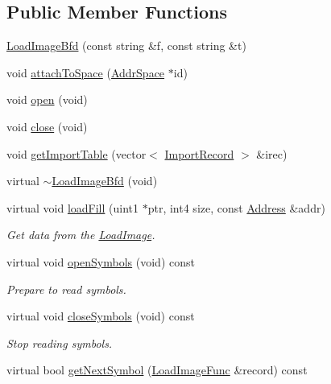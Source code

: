 \subsection*{Public Member Functions}
\begin{DoxyCompactItemize}
\item 
\mbox{\hyperlink{class_load_image_bfd_a3dbf8efbc462647404d8263f2e42b18c}{Load\+Image\+Bfd}} (const string \&f, const string \&t)
\item 
void \mbox{\hyperlink{class_load_image_bfd_ae7779df9e518dba07746692c5391cd82}{attach\+To\+Space}} (\mbox{\hyperlink{class_addr_space}{Addr\+Space}} $\ast$id)
\item 
void \mbox{\hyperlink{class_load_image_bfd_a87816fd410acb9003a010e8cb4b2b5f4}{open}} (void)
\item 
void \mbox{\hyperlink{class_load_image_bfd_af0297020340300588572090ae50ff145}{close}} (void)
\item 
void \mbox{\hyperlink{class_load_image_bfd_aed37920fc29c5251f29061bf4479e6fc}{get\+Import\+Table}} (vector$<$ \mbox{\hyperlink{struct_import_record}{Import\+Record}} $>$ \&irec)
\item 
virtual \mbox{\hyperlink{class_load_image_bfd_a449f33ca39e93b36288d2b45c18831d8}{$\sim$\+Load\+Image\+Bfd}} (void)
\item 
virtual void \mbox{\hyperlink{class_load_image_bfd_a78225283223f58c852c4b63af4fc8791}{load\+Fill}} (uint1 $\ast$ptr, int4 size, const \mbox{\hyperlink{class_address}{Address}} \&addr)
\begin{DoxyCompactList}\small\item\em Get data from the \mbox{\hyperlink{class_load_image}{Load\+Image}}. \end{DoxyCompactList}\item 
virtual void \mbox{\hyperlink{class_load_image_bfd_a55a11f9c90d067643acb55b197179878}{open\+Symbols}} (void) const
\begin{DoxyCompactList}\small\item\em Prepare to read symbols. \end{DoxyCompactList}\item 
virtual void \mbox{\hyperlink{class_load_image_bfd_aaf25ff18d5cec7300dcd28ca4150b8ce}{close\+Symbols}} (void) const
\begin{DoxyCompactList}\small\item\em Stop reading symbols. \end{DoxyCompactList}\item 
virtual bool \mbox{\hyperlink{class_load_image_bfd_a8db5bae4688dfea449ed8c5e9d584904}{get\+Next\+Symbol}} (\mbox{\hyperlink{struct_load_image_func}{Load\+Image\+Func}} \&record) const

\end{DoxyCompactItemize}
